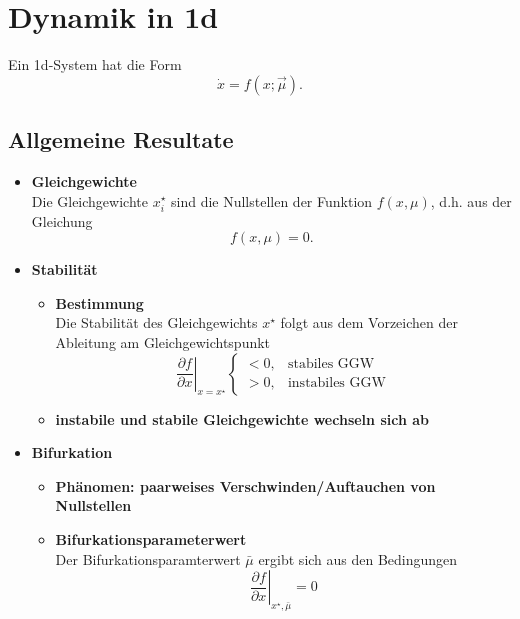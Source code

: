 \documentclass{article}
\begin{document}
	
\newpage


\section{Dynamik in 1d}
Ein 1d-System hat die Form
	\begin{equation}
		\dot{x} = f(x; \vec{\mu}).
	\end{equation}


\subsection{Allgemeine Resultate}
	\begin{itemize}
		\item \textbf{Gleichgewichte}\\
		Die Gleichgewichte $x_i^\star$ sind die Nullstellen der Funktion $f(x,\mu)$, d.h. aus der Gleichung
			\begin{equation}
				f(x, \mu) = 0.
			\end{equation}

		
		\item \textbf{Stabilität}
		\begin{itemize}
			\item \textbf{Bestimmung}\\
			Die Stabilität des Gleichgewichts $x^\star$ folgt aus dem Vorzeichen der Ableitung am Gleichgewichtspunkt
				\begin{equation}
					\left. \frac{\partial f}{\partial x} \right|_{x=x^\star}
					\begin{cases}
						<0, & \text{stabiles GGW} \\
						>0, & \text{instabiles GGW}
					\end{cases}
				\end{equation}
			
			
			\item \textbf{instabile und stabile Gleichgewichte wechseln sich ab}
		\end{itemize}					
		

		\item \textbf{Bifurkation}
		\begin{itemize}
			\item \textbf{Phänomen: paarweises Verschwinden/Auftauchen von Nullstellen}
			
			
			\item \textbf{Bifurkationsparameterwert}\\
			Der Bifurkationsparamterwert $\bar{\mu}$ ergibt sich aus den Bedingungen
				\begin{equation}
					\left. \frac{\partial f}{\partial x} \right|_{x^\star, \bar{\mu}} = 0
				\end{equation}
		\end{itemize}
		

\end{itemize}
\end{document}
